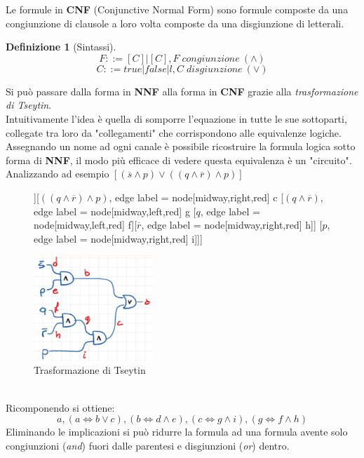 \documentclass[a4paper]{article}
\newtheorem*{definition}{Definizione}
\begin{document}
Le formule in \textbf{CNF} (Conjunctive Normal Form) sono formule composte da una congiunzione di clausole a loro volta composte da una disgiunzione di letterali.
\begin{definition}[Sintassi]
	$$F::= [C]|[C],F \; congiunzione \: (\land)$$
	$$C::=true|false|l,C \; disgiunzione \: (\lor)$$
\end{definition}
Si può passare dalla forma in \textbf{NNF} alla forma in \textbf{CNF} grazie alla \textit{trasformazione di Tseytin}.\\
Intuitivamente l'idea è quella di somporre l'equazione in tutte le sue sottoparti, collegate tra loro da "collegamenti" che corrispondono alle equivalenze logiche.
Assegnando un nome ad ogni canale è possibile ricostruire la formula logica sotto forma di \textbf{NNF}, il modo più efficace di vedere questa equivalenza è un "circuito".
Analizzando ad esempio $[(\overline s \land p) \lor ((q \land \overline r) \land p)]$
\begin{figure}[!ht]
\centering
\begin{forest}
	[$(\overline s \land p) \lor ((q \land \overline r) \land p)$[$\overline s \land p$, , edge label = {node[midway,left,red] {b}} [$\overline s$, , edge label = {node[midway,left,red] {d}}][$p$,, edge label = {node[midway,right,red] {e}}]][$((q \land \overline r) \land p)$, edge label = {node[midway,right,red] {c}} [$(q \land \overline r)$, edge label = {node[midway,left,red] {g}} [$q$, edge label = {node[midway,left,red] {f}}][$\overline r$, edge label = {node[midway,right,red] {h}}]] [$p$, edge label = {node[midway,right,red] {i}}]]]
\end{forest}
\includegraphics[width=0.4\textwidth]{./img/E7_circuit}
\caption{Trasformazione di Tseytin} \label{FIG:E7_circuit}
\end{figure}\\
Ricomponendo si ottiene:
$$ a,(a \Leftrightarrow b \lor c), (b \Leftrightarrow d \land e), (c \Leftrightarrow g \land i), (g \Leftrightarrow f \land h)$$
Eliminando le implicazioni si può ridurre la formula ad una formula avente solo congiunzioni (\textit{and}) fuori dalle parentesi e disgiunzioni (\textit{or}) dentro.
\end{document}
